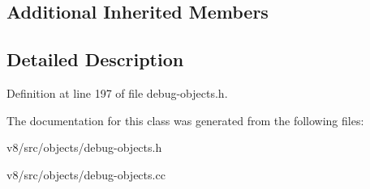 \subsection*{Additional Inherited Members}


\subsection{Detailed Description}


Definition at line 197 of file debug-\/objects.\+h.



The documentation for this class was generated from the following files\+:\begin{DoxyCompactItemize}
\item 
v8/src/objects/debug-\/objects.\+h\item 
v8/src/objects/debug-\/objects.\+cc\end{DoxyCompactItemize}
